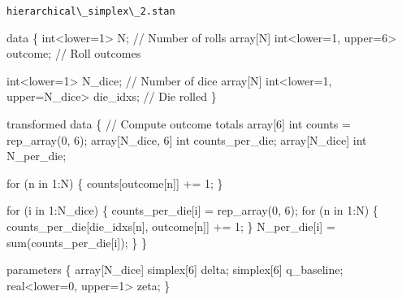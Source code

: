 \documentclass[
  letterpaper,
  DIV=11,
  numbers=noendperiod]{scrartcl}
\newenvironment{Shaded}{\begin{snugshade}}{\end{snugshade}}
\newcommand{\CommentTok}[1]{\textcolor[rgb]{0.37,0.37,0.37}{#1}}
\newcommand{\ControlFlowTok}[1]{\textcolor[rgb]{0.00,0.23,0.31}{#1}}
\newcommand{\DataTypeTok}[1]{\textcolor[rgb]{0.68,0.00,0.00}{#1}}
\newcommand{\DecValTok}[1]{\textcolor[rgb]{0.68,0.00,0.00}{#1}}
\newcommand{\KeywordTok}[1]{\textcolor[rgb]{0.00,0.23,0.31}{#1}}
\newcommand{\NormalTok}[1]{\textcolor[rgb]{0.00,0.23,0.31}{#1}}
\begin{document}
\begin{codelisting}

\caption{\texttt{hierarchical\textbackslash\_simplex\textbackslash\_2.stan}}

\begin{Shaded}
\begin{Highlighting}[]
\KeywordTok{data}\NormalTok{ \{}
  \DataTypeTok{int}\NormalTok{\textless{}}\KeywordTok{lower}\NormalTok{=}\DecValTok{1}\NormalTok{\textgreater{} N;                         }\CommentTok{// Number of rolls}
  \DataTypeTok{array}\NormalTok{[N] }\DataTypeTok{int}\NormalTok{\textless{}}\KeywordTok{lower}\NormalTok{=}\DecValTok{1}\NormalTok{, }\KeywordTok{upper}\NormalTok{=}\DecValTok{6}\NormalTok{\textgreater{} outcome; }\CommentTok{// Roll outcomes}

  \DataTypeTok{int}\NormalTok{\textless{}}\KeywordTok{lower}\NormalTok{=}\DecValTok{1}\NormalTok{\textgreater{} N\_dice;                          }\CommentTok{// Number of dice}
  \DataTypeTok{array}\NormalTok{[N] }\DataTypeTok{int}\NormalTok{\textless{}}\KeywordTok{lower}\NormalTok{=}\DecValTok{1}\NormalTok{, }\KeywordTok{upper}\NormalTok{=N\_dice\textgreater{} die\_idxs; }\CommentTok{// Die rolled}
\NormalTok{\}}

\KeywordTok{transformed data}\NormalTok{ \{}
  \CommentTok{// Compute outcome totals}
  \DataTypeTok{array}\NormalTok{[}\DecValTok{6}\NormalTok{] }\DataTypeTok{int}\NormalTok{ counts = rep\_array(}\DecValTok{0}\NormalTok{, }\DecValTok{6}\NormalTok{);}
  \DataTypeTok{array}\NormalTok{[N\_dice, }\DecValTok{6}\NormalTok{] }\DataTypeTok{int}\NormalTok{ counts\_per\_die;}
  \DataTypeTok{array}\NormalTok{[N\_dice] }\DataTypeTok{int}\NormalTok{ N\_per\_die;}

  \ControlFlowTok{for}\NormalTok{ (n }\ControlFlowTok{in} \DecValTok{1}\NormalTok{:N) \{}
\NormalTok{    counts[outcome[n]] += }\DecValTok{1}\NormalTok{;}
\NormalTok{  \}}

  \ControlFlowTok{for}\NormalTok{ (i }\ControlFlowTok{in} \DecValTok{1}\NormalTok{:N\_dice) \{}
\NormalTok{    counts\_per\_die[i] = rep\_array(}\DecValTok{0}\NormalTok{, }\DecValTok{6}\NormalTok{);}
    \ControlFlowTok{for}\NormalTok{ (n }\ControlFlowTok{in} \DecValTok{1}\NormalTok{:N) \{}
\NormalTok{      counts\_per\_die[die\_idxs[n], outcome[n]] += }\DecValTok{1}\NormalTok{;}
\NormalTok{    \}}
\NormalTok{    N\_per\_die[i] = sum(counts\_per\_die[i]);}
\NormalTok{  \}}
\NormalTok{\}}

\KeywordTok{parameters}\NormalTok{ \{}
  \DataTypeTok{array}\NormalTok{[N\_dice] }\DataTypeTok{simplex}\NormalTok{[}\DecValTok{6}\NormalTok{] delta;}
  \DataTypeTok{simplex}\NormalTok{[}\DecValTok{6}\NormalTok{] q\_baseline;}
  \DataTypeTok{real}\NormalTok{\textless{}}\KeywordTok{lower}\NormalTok{=}\DecValTok{0}\NormalTok{, }\KeywordTok{upper}\NormalTok{=}\DecValTok{1}\NormalTok{\textgreater{} zeta;}
\NormalTok{\}}


\end{Highlighting}
\end{Shaded}
\end{codelisting}
\end{document}

